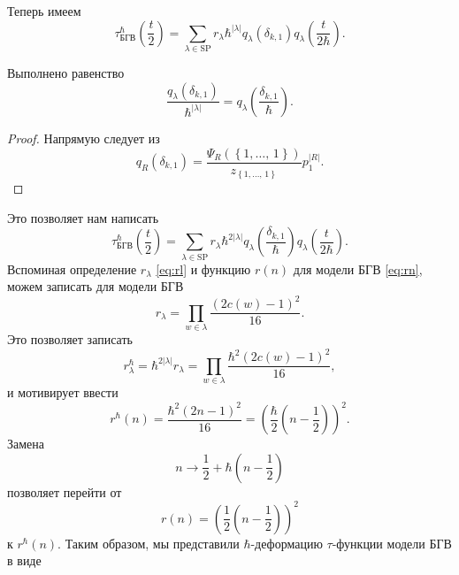 \documentclass[a4paper,14pt]{extarticle}
\numberwithin{equation}{section}
\begin{document}
Теперь имеем
\begin{equation}
	\tau^\hbar _{\text{БГВ}}\left( \frac{t}{2} \right) =\sum_{\lambda \in \mathrm{SP}}
	r_\lambda \hbar ^{|\lambda|}q_\lambda\left( \delta_{k,1} \right) q_\lambda\left( \frac{t }{2\hbar } \right) 
.\end{equation}
\begin{stm*}

Выполнено равенство
\begin{equation}
	\frac{q_{\lambda}\left( \delta_{k,1} \right) 
}{\hbar ^{|\lambda|}}= q_\lambda \left( \frac{\delta_{k,1}}{\hbar } \right)  .\end{equation} 
\end{stm*}
\begin{proof}
Напрямую следует из 
\[
	q_R\left( \delta_{k,1} \right) =
	\frac{\Psi_R\left( \left\{ 1,\ldots,\,1 \right\}  \right) }{z_{\left\{ 1,\ldots,\,1 \right\} }}p_1^{|R|}
.\] 
\end{proof}
Это позволяет нам написать
\begin{equation}
	\tau^\hbar _{\text{БГВ}}\left( \frac{t}{2} \right) =\sum_{\lambda \in \mathrm{SP}}
	r_\lambda \hbar ^{2|\lambda|}q_\lambda\left( \frac{\delta_{k,1}}{\hbar } \right) q_\lambda\left( \frac{t }{2\hbar } \right) 
.\end{equation}
Вспоминая определение $r_\lambda$ \eqref{eq:rl} и функцию
$r(n)$ для модели БГВ  \eqref{eq:rn}, можем
записать для модели БГВ
\begin{equation}
	r_\lambda= \prod_{w \in \lambda}^{} \frac{(2c(w)-1)^2}{16} 
.\end{equation} 
Это позволяет записать
\begin{equation}
r_\lambda^\hbar =\hbar ^{2|\lambda|}r_\lambda=\prod_{w \in \lambda}^{} 
\frac{\hbar ^2 \left( 2c(w)-1 \right) ^2}{16}
,\end{equation} 
и мотивирует ввести
\begin{equation}
	r^\hbar(n) = \frac{\hbar ^2 (2n-1)^2}{16}=
	\left( \frac{\hbar}{2}\left( n-\frac{1}{2} \right)  \right) ^2
.\end{equation} 
Замена
\begin{equation}
	n\to \frac{1}{2}+ \hbar \left( n-\frac{1}{2} \right) 
\end{equation} 
позволяет перейти от 
\begin{equation}
	r(n)=\left( \frac{1}{2}\left( n-\frac{1}{2} \right)  \right) ^2
\end{equation} 
к $r^\hbar (n)$. Таким образом, мы представили  $\hbar $-деформацию $\tau$-функции модели БГВ в виде
\end{document}
